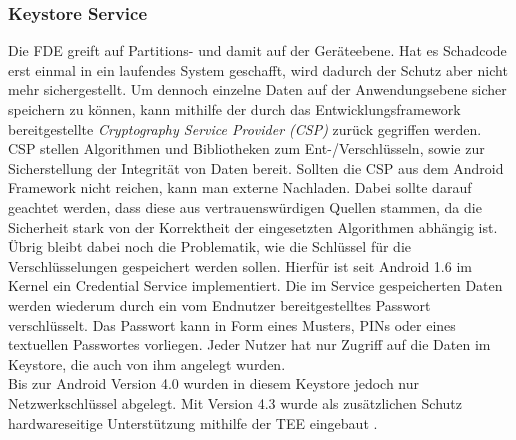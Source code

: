 	\subsubsection{Keystore Service}
	Die FDE greift auf Partitions- und damit auf der Geräteebene. Hat es Schadcode
	erst einmal in ein laufendes System geschafft, wird dadurch der Schutz aber
	nicht mehr sichergestellt. Um dennoch einzelne Daten auf der Anwendungsebene
	sicher speichern zu können, kann mithilfe der durch das Entwicklungsframework
	bereitgestellte \textit{Cryptography Service Provider (CSP)} zurück gegriffen
	werden.
	CSP stellen Algorithmen und Bibliotheken zum Ent-/Verschlüsseln, sowie zur
	Sicherstellung der Integrität von Daten bereit. Sollten die CSP aus dem
	Android Framework nicht reichen, kann man externe Nachladen. Dabei sollte
	darauf geachtet werden, dass diese aus vertrauenswürdigen Quellen stammen, da
	die Sicherheit stark von der Korrektheit der eingesetzten Algorithmen abhängig
	ist. Übrig bleibt dabei noch die Problematik, wie die Schlüssel für die
	Verschlüsselungen gespeichert werden sollen. Hierfür ist seit Android 1.6 im
	Kernel ein Credential Service implementiert. Die im Service gespeicherten
	Daten werden wiederum durch ein vom Endnutzer bereitgestelltes Passwort
	verschlüsselt. Das Passwort kann in Form eines Musters, PINs oder eines
	textuellen Passwortes vorliegen. Jeder Nutzer hat nur Zugriff auf die
	Daten im Keystore, die auch von ihm angelegt wurden.\\
	Bis zur Android Version 4.0 wurden in diesem Keystore jedoch nur
	Netzwerkschlüssel abgelegt. Mit Version 4.3 wurde als zusätzlichen Schutz
	hardwareseitige Unterstützung mithilfe der TEE eingebaut \cite[S.
	175]{Drake2014}.
